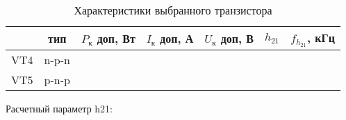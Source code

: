 \begin{table}[htbp]
\caption{Характеристики выбранного транзистора}
\begin{center}\begin{tabular}{|c|c|c|c|c|c|c|}
\hline 
  & тип & $P_{\text{к}}$ доп, Вт & $I_{\text{к}}$ доп, А & $U_{\text{к}}$ доп, В & $h_{21}$ &  $f_{h_{21}}$, кГц \\ 
\hline 
VT4 & n-p-n &   &  &  &  & \\ 
\hline 
VT5 & p-n-p &   &  &  &  &  \\ 
\hline 
\end{tabular} 
\end{center}
\end{table}

Расчетный параметр h21:
